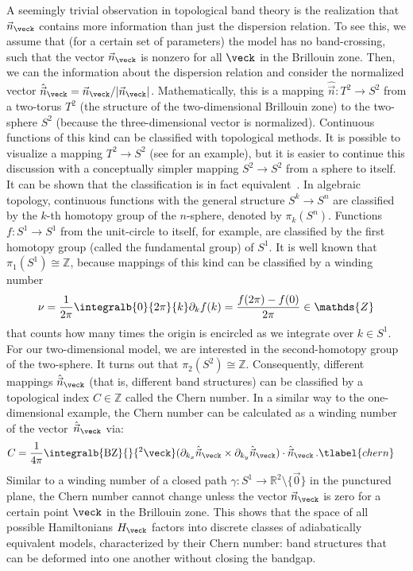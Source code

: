 A seemingly trivial observation in topological band theory is the realization that $\vec{n}_\veck$ contains more information than just the dispersion relation.
To see this, we assume that (for a certain set of parameters) the model has no band-crossing, such that the vector $\vec{n}_\veck$ is nonzero for all $\veck$ in the Brillouin zone.
Then, we can  the information about the dispersion relation and consider the normalized vector $\hat{\vec{n}}_\veck = \vec{n}_\veck/|\vec{n}_\veck|$.
Mathematically, this is a mapping $\hat{\vec{n}}\colon T^2 \to S^2$ from a two-torus $T^2$ (the structure of the two-dimensional Brillouin zone) to the two-sphere $S^2$ (because the three-dimensional vector is normalized).
Continuous functions of this kind can be classified with topological methods.
It is possible to visualize a mapping $T^2 \to S^2$ (see  for an example), but it is easier to continue this discussion with a conceptually simpler mapping $S^2 \to S^2$ from a sphere to itself.
It can be shown that the classification is in fact equivalent~\cite{Moore2011}.
In algebraic topology, continuous functions with the general structure $S^k \to S^n$ are classified by the $k$-th homotopy group of the $n$-sphere, denoted by $\pi_k(S^n)$.
Functions $f\colon S^1 \to S^1$ from the unit-circle to itself, for example, are classified by the first homotopy group (called the fundamental group) of $S^1$.
It is well known that $\pi_1(S^1) \cong \mathds{Z}$, because mappings of this kind can be classified by a winding number
\begin{align}
    \nu = \frac{1}{2\pi}\integralb{0}{2\pi}{k} \partial_k f(k) = \frac{f(2\pi)-f(0)}{2\pi} \in \mathds{Z}
\end{align}
that counts how many times the origin is encircled as we integrate over $k \in S^1$.
For our two-dimensional model, we are interested in the second-homotopy group of the two-sphere.
It turns out that $\pi_2(S^2) \cong \mathds{Z}$.
Consequently, different mappings $\hat{\vec{n}}_\veck$ (that is, different band structures) can be classified by a topological index $C \in \mathds{Z}$ called the Chern number.
In a similar way to the one-dimensional example, the Chern number can be calculated as a winding number of the vector~$\hat{\vec{n}}_\veck$ via:
\begin{align}
    C &= \frac{1}{4\pi}\integralb{\text{BZ}}{}{^2\veck} ( \partial_{k_x} \hat{\vec{n}}_{\veck} \times \partial_{k_y} \hat{\vec{n}}_{\veck} ) \cdot \hat{\vec{n}}_{\veck} \, . \tlabel{chern}
\end{align}
Similar to a winding number of a closed path $\gamma\colon S^1 \to \mathds{R}^2 \setminus \{ \vec{0} \}$ in the punctured plane, the Chern number cannot change unless the vector $\vec{n}_\veck$ is zero for a certain point $\veck$ in the Brillouin zone.
This shows that the space of all possible Hamiltonians $H_\veck$ factors into discrete classes of adiabatically equivalent models, characterized by their Chern number: band structures that can be deformed into one another without closing the bandgap.

